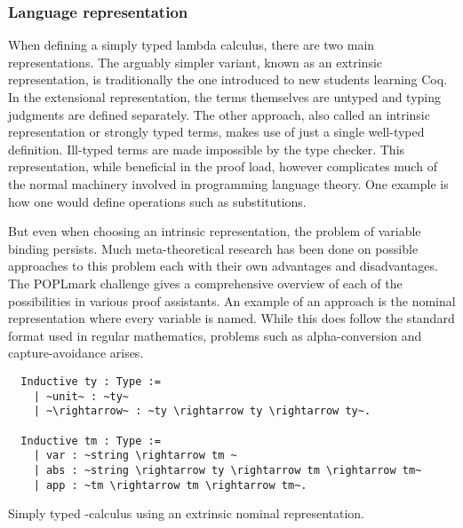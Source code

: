 \documentclass[a4, 12pt, final]{article}
\begin{document}
\subsubsection{Language representation}

When defining a simply typed lambda calculus, there are two main representations.
The arguably simpler variant, known as an extrinsic representation, is traditionally the one introduced to new students learning Coq.
In the extensional representation, the terms themselves are untyped and typing judgments are defined separately.
The other approach, also called an intrinsic representation or strongly typed terms, makes use of just a single well-typed definition.
Ill-typed terms are made impossible by the type checker.
This representation, while beneficial in the proof load, however complicates much of the normal machinery involved in programming language theory.
One example is how one would define operations such as substitutions.

But even when choosing an intrinsic representation, the problem of variable binding persists.
Much meta-theoretical research has been done on possible approaches to this problem each with their own advantages and disadvantages.
The POPLmark challenge gives a comprehensive overview of each of the possibilities in various proof assistants\cite{Aydemir2005}.
An example of an approach is the nominal representation where every variable is named.
While this does follow the standard format used in regular mathematics, problems such as alpha-conversion and capture-avoidance arises.

\begin{listing}
  \begin{verbatim}
  Inductive ty : Type :=
    | ~unit~ : ~ty~
    | ~\rightarrow~ : ~ty \rightarrow ty \rightarrow ty~.

  Inductive tm : Type :=
    | var : ~string \rightarrow tm ~
    | abs : ~string \rightarrow ty \rightarrow tm \rightarrow tm~
    | app : ~tm \rightarrow tm \rightarrow tm~.
  \end{verbatim}
  \caption{Simply typed \lambda-calculus using an extrinsic nominal representation.}
  \label{lst:nominal_stlc}
\end{listing}
\end{document}
